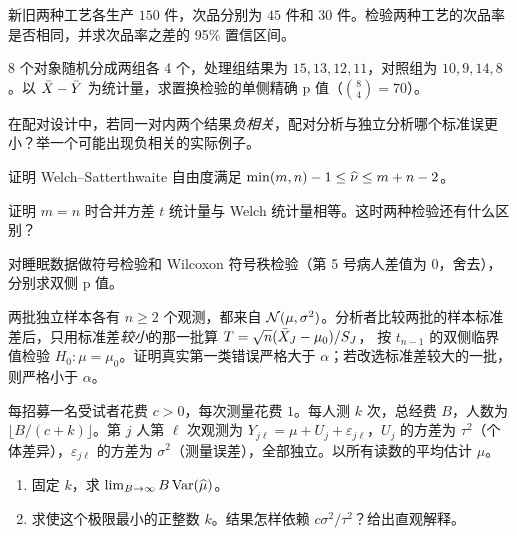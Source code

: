 \begin{exercise}
新旧两种工艺各生产 $150$ 件，次品分别为 $45$ 件和 $30$ 件。检验两种工艺的次品率是否相同，并求次品率之差的 95\% 置信区间。
\end{exercise}

\begin{exercise}
8 个对象随机分成两组各 4 个，处理组结果为 $15,13,12,11$，对照组为 $10,9,14,8$。以 $\bar{X}-\bar{Y}$ 为统计量，求置换检验的单侧精确 p 值（$\binom84=70$）。
\end{exercise}

\levelB
\begin{exercise}
在配对设计中，若同一对内两个结果\emph{负相关}，配对分析与独立分析哪个标准误更小？举一个可能出现负相关的实际例子。
\end{exercise}

\begin{exercise}\label{ex5:df}
证明 Welch–Satterthwaite 自由度满足 $\min(m,n)-1\le\widehat{\nu}\le m+n-2$。
\end{exercise}

\begin{exercise}
证明 $m=n$ 时合并方差 $t$ 统计量与 Welch 统计量相等。这时两种检验还有什么区别？
\end{exercise}

\begin{exercise}
对睡眠数据做符号检验和 Wilcoxon 符号秩检验（第 5 号病人差值为 $0$，舍去），分别求双侧 p 值。
\end{exercise}

\levelC
\begin{exercise}[原讲义习题 6.1]\label{ex5:select}
两批独立样本各有 $n\ge2$ 个观测，都来自 $\mathcal{N}(\mu,\sigma^2)$。分析者比较两批的样本标准差后，只用标准差\emph{较小}的那一批算 $T=\sqrt n(\bar{X}_J-\mu_0)/S_J$，
按 $t_{n-1}$ 的双侧临界值检验 $H_0:\mu=\mu_0$。证明真实第一类错误严格大于 $\alpha$；若改选标准差较大的一批，则严格小于 $\alpha$。
\end{exercise}

\begin{exercise}[原讲义习题 6.7]
每招募一名受试者花费 $c>0$，每次测量花费 $1$。每人测 $k$ 次，总经费 $B$，人数为 $\lfloor B/(c+k)\rfloor$。第 $j$ 人第 $\ell$ 次观测为
$Y_{j\ell}=\mu+U_j+\varepsilon_{j\ell}$，$U_j$ 的方差为 $\tau^2$（个体差异），$\varepsilon_{j\ell}$ 的方差为 $\sigma^2$（测量误差），全部独立。以所有读数的平均估计 $\mu$。
\begin{enumerate}
\item 固定 $k$，求 $\lim_{B\to\infty}B\operatorname{Var}(\widehat{\mu})$。
\item 求使这个极限最小的正整数 $k$。结果怎样依赖 $c\sigma^2/\tau^2$？给出直观解释。
\end{enumerate}
\end{exercise}
